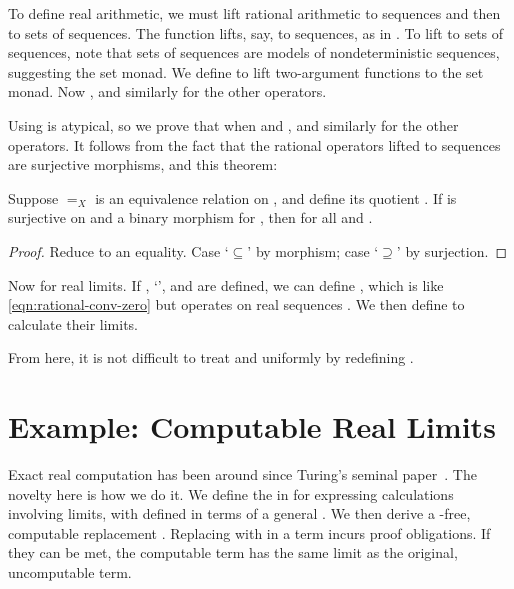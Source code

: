 To define real arithmetic, we must lift rational arithmetic to sequences and then to sets of sequences. The  function lifts, say, \tlzfc{+_\Rat} to sequences, as in . To lift  to sets of sequences, note that sets of sequences are models of nondeterministic sequences, suggesting the set monad. We define
to lift two-argument functions to the set monad. Now , and similarly for the other operators.

Using  is atypical, so we prove that  when  and , and similarly for the other operators. It follows from the fact that the rational operators lifted to sequences are surjective morphisms, and this theorem:

\begin{theorem}
\label{thm:set-monad-okay}
\newcommand{\X}{\mathbb{X}}
Suppose $=_X$ is an equivalence relation on , and define its quotient \tlzfc{\X \objdef quotient~X~(=_X)}. If  is surjective on  and a binary morphism for , then \tlzfc{(lift2_{set}~op~A~B) \in \X} for all \tlzfc{A \in \X} and \tlzfc{B \in \X}.
\end{theorem}
\begin{proof}
Reduce to an equality. Case `$\subseteq$' by morphism; case `$\supseteq$' by surjection.
\end{proof}

Now for real limits. If \tlzfc{\Re^+}, `\tlzfc{<}', and \tlzfc{|\cdot|} are defined, we can define , which is like \eqref{eqn:rational-conv-zero} but operates on real sequences . We then define  to calculate their limits.

From here, it is not difficult to treat \tlzfc{\Rat} and \tlzfc{\Re} uniformly by redefining \tlzfc{\Rat \subset \Re}.


\section{Example: Computable Real Limits}

\newcommand{\seqtype}[1]{\lnat \to {#1}}

Exact real computation has been around since Turing's seminal paper~\cite{cit:turing}. The novelty here is how we do it. We define the  in \targetlang for expressing calculations involving limits, with  defined in terms of a general . We then derive a -free, computable replacement . Replacing  with  in a \targetlang term incurs proof obligations. If they can be met, the computable \targetlang term has the same limit as the original, uncomputable term.

